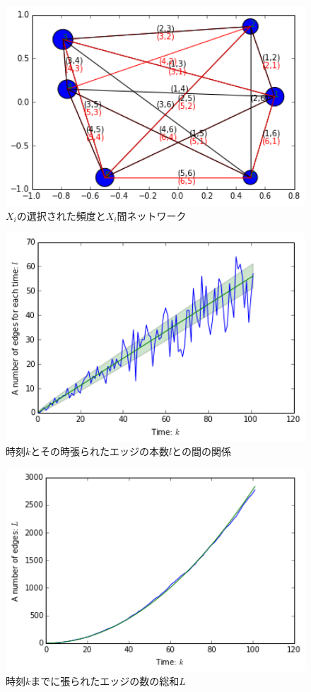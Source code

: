 \begin{figure}[H]
    \begin{center}
        \includegraphics[width=12.5cm]{../download2_2.png}
        \caption{$X_{i}$の選択された頻度と$X_{i}$間ネットワーク}
        \label{fig:f4}
    \end{center}
\end{figure}
\begin{figure}[H]
    \begin{center}
        \includegraphics[width=12.5cm]{../download2_3.png}
        \caption{時刻$k$とその時張られたエッジの本数$l$との間の関係}
        \label{fig:f5}
    \end{center}
\end{figure}
\begin{figure}[H]
    \begin{center}
        \includegraphics[width=12.5cm]{../download2_4.png}
        \caption{時刻$k$までに張られたエッジの数の総和$L$}
        \label{fig:f6}
    \end{center}
\end{figure}



